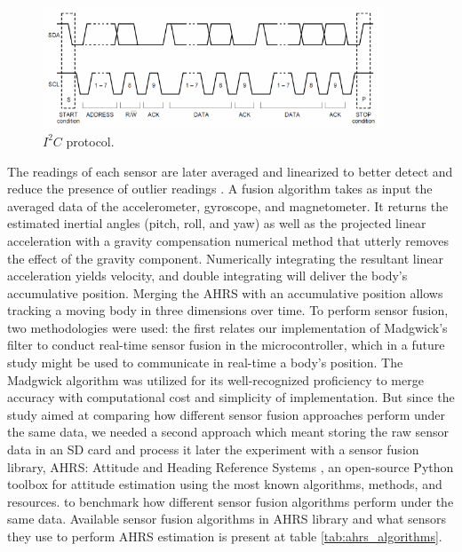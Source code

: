 \begin{figure}[!h]
    \centering
    \includegraphics[width=0.9\textwidth]{figures/i2c.png}
    \caption{ $I^2C$ protocol. }
    \label{fig:i2c}
\end{figure}

The readings of each sensor are later averaged and linearized to better detect and reduce the presence of outlier readings \cite{khamphroo2017micropython}. A fusion algorithm takes as input the averaged data of the accelerometer, gyroscope, and magnetometer. It returns the estimated inertial angles (pitch, roll, and yaw) as well as the projected linear acceleration with a gravity compensation numerical method that utterly removes the effect of the gravity component. Numerically integrating the resultant linear acceleration yields velocity, and double integrating will deliver the body's accumulative position. Merging the AHRS with an accumulative position allows tracking a moving body in three dimensions over time. To perform sensor fusion, two methodologies were used: the first relates our implementation of Madgwick's filter to conduct real-time sensor fusion in the microcontroller, which in a future study might be used to communicate in real-time a body's position. The Madgwick algorithm was utilized for its well-recognized proficiency to merge accuracy with computational cost and simplicity of implementation. But since the study aimed at comparing how different sensor fusion approaches perform under the same data, we needed a second approach which meant storing the raw sensor data in an SD card and process it later the experiment with a sensor fusion library, AHRS: Attitude and Heading Reference Systems \cite{ahrs}, an open-source Python toolbox for attitude estimation using the most known algorithms, methods, and resources. to benchmark how different sensor fusion algorithms perform under the same data. Available sensor fusion algorithms in AHRS library and what sensors they use to perform AHRS estimation is present at table \ref{tab:ahrs_algorithms}.


